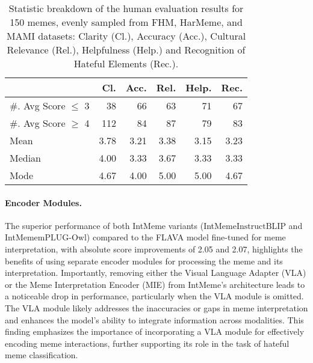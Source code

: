 \begin{table}[t]
  \centering
  \begin{tabular}{lrrrrr}
    \toprule
    & \textbf{Cl.}&\textbf{Acc.} &\textbf{Rel.}&\textbf{Help.} & \textbf{Rec.} \\
    \midrule
    \#. Avg Score $\leq$ 3 & 38 & 66 & 63 & 71 & 67 \\
    \#. Avg Score $\geq$ 4 & 112 & 84 & 87 & 79 & 83 \\
    \midrule
    Mean & 3.78 & 3.21 & 3.38 & 3.15 & 3.23 \\
    Median & 4.00 & 3.33 & 3.67 & 3.33 & 3.33 \\
    Mode & 4.67 & 4.00 & 5.00 & 5.00 & 4.67 \\
    \bottomrule
\end{tabular}
\caption{Statistic breakdown of the human evaluation results for 150 memes, evenly sampled from FHM, HarMeme, and MAMI datasets: Clarity (Cl.), Accuracy (Acc.), Cultural Relevance (Rel.), Helpfulness (Help.) and Recognition of Hateful Elements (Rec.).}
\label{tab:human-evaluation}
\end{table}

\paragraph{Encoder Modules.} 
The superior performance of both \textsf{IntMeme} variants (IntMeme$\text{InstructBLIP}$ and IntMeme$\text{mPLUG-Owl}$) compared to the FLAVA model fine-tuned for meme interpretation, with absolute score improvements of 2.05 and 2.07, highlights the benefits of using separate encoder modules for processing the meme and its interpretation. Importantly, removing either the Visual Language Adapter (VLA) or the Meme Interpretation Encoder (MIE) from IntMeme's architecture leads to a noticeable drop in performance, particularly when the VLA module is omitted. The VLA module likely addresses the inaccuracies or gaps in meme interpretation and enhances the model's ability to integrate information across modalities. This finding emphasizes the importance of incorporating a VLA module for effectively encoding meme interactions, further supporting its role in the task of hateful meme classification.